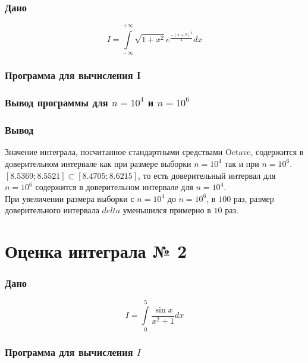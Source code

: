 \documentclass{article}
\begin{document}
	\subsubsection{Дано}
	$$ I = \int\limits_{-\infty}^{+\infty} \sqrt{1 + x ^ 2} e^{\frac{-(x + 2)^2}{4}} dx$$
	\subsubsection{Программа для вычисления I}
	\begin{minipage}{\linewidth}
		
	\end{minipage}
	\subsubsection{Вывод программы для $n = 10 ^ 4$ и $n = 10 ^ 6$}
	\begin{minipage}{\linewidth}
		
		
	\end{minipage}
	\subsubsection{Вывод}
	Значение  интеграла, посчитанное стандартными средствами Octave, содержится в доверительном интервале как при размере выборки $n = 10^4$ так и при $n = 10^6$. \\
	$[8.5369; 8.5521] \subset [8.4705; 8.6215]$, то есть доверительный интервал для $n = 10^6$ содержится в доверительном интервале для $n = 10^4$. \\
	При увеличении размера выборки с $n = 10 ^ 4$ до $n = 10 ^ 6$, в $100$ раз, размер доверительного интервала $delta$ уменьшился примерно в $10$ раз.
	
	
	\section{Оценка интеграла № 2}
	\subsubsection{Дано}
	$$I = \int\limits_{0}^{5} \frac{\sin{x}}{x ^ 2 + 1}dx$$
	\subsubsection{Программа для вычисления $I$}
	\begin{minipage}{\linewidth}
		
	\end{minipage}
	
\end{document}

